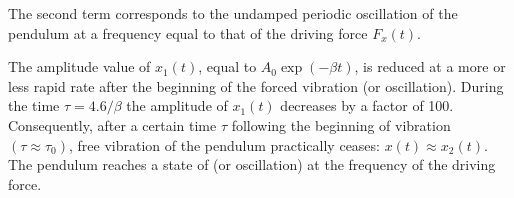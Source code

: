 The second term corresponds to the undamped periodic oscillation of the pendulum at a frequency equal to that of the driving force $F_{x} (t)$.

The amplitude value of $x_{1} (t)$, equal to $A_{0} \exp (-\beta t)$, is reduced at a more or less rapid rate after the beginning of the forced vibration (or oscillation). During the time $\tau = 4.6/\beta$ the amplitude of $x_{1} (t)$ decreases by a factor of 100. Consequently, after a certain time $\tau$ following the beginning of vibration $(\tau \approx \tau_{0})$, free vibration of the pendulum practically ceases: $x (t) \approx x_{2}(t)$. The pendulum reaches a state of  (or oscillation) at the frequency of the driving force.


